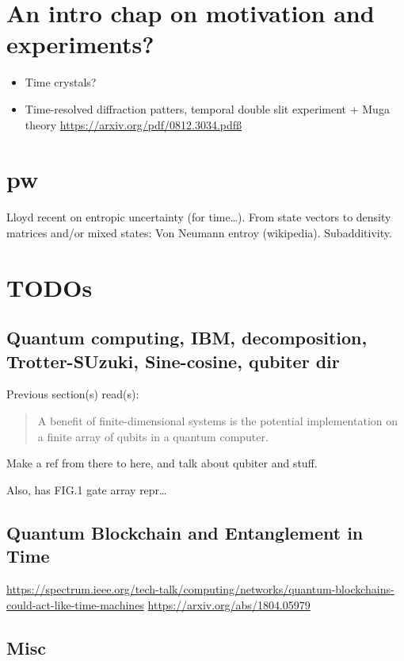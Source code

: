 \section{An intro chap on motivation and experiments?}
\begin{itemize}
  \item Time crystals?
  \item Time-resolved diffraction patters, temporal double slit experiment + Muga theory \url{https://arxiv.org/pdf/0812.3034.pdfß}
\end{itemize}


\section{pw}

Lloyd recent on entropic uncertainty (for time\dots).
From state vectors to density matrices and/or mixed states: Von Neumann entroy (wikipedia).
Subadditivity. 

\section{TODOs}

\subsection{Quantum computing, IBM, decomposition, Trotter-SUzuki, Sine-cosine, qubiter dir}

Previous section(s) read(s):
\begin{quote}
  A benefit of finite-dimensional systems is the potential implementation on a finite array of
  qubits in a quantum computer.
\end{quote}
Make a ref from there to here, and talk about qubiter and stuff.

Also, \cite{Moreva:illustration} has FIG.1 gate array repr\dots

\subsection{Quantum Blockchain and Entanglement in Time}

\url{https://spectrum.ieee.org/tech-talk/computing/networks/quantum-blockchains-could-act-like-time-machines}
\url{https://arxiv.org/abs/1804.05979}


\subsection{Misc}


